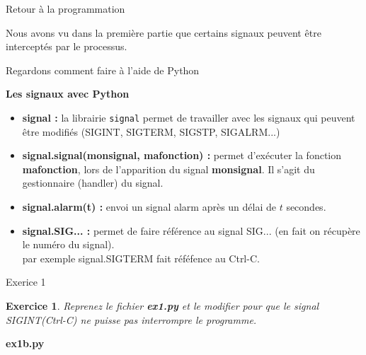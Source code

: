 \documentclass[9pt]{beamer}
\newenvironment{code}[1]{%
    \begin{bclogo}[couleur=backcolour, couleurTexte=black ,couleurBord=bleulapis ,couleurBarre=black, ombre=false,epBord=0.9,logo=\#,arrondi=0.1]{{\bfseries #1}}%
    }%
    {%
    \end{bclogo}
}%
\newtheorem{exercise}{Exercice}
\begin{document}
\begin{frame}{Retour à la
    programmation}

Nous avons vu dans la première partie que certains signaux peuvent être interceptés par le processus. 

Regardons comment faire à l'aide de Python
\begin{bclogo}[couleur=couleurdef, couleurTexte=black ,couleurBord=black ,couleurBarre=blue, ombre=false,epBord=0.9,logo=\bcbook,arrondi=0.1]{{\bfseries Les signaux avec Python}}
\begin{itemize}
    \item[\textbullet] {\bfseries signal :} la librairie  \texttt{signal} permet de travailler avec les signaux qui peuvent être modifiés (SIGINT, SIGTERM, SIGSTP, SIGALRM...)
    \item[\textbullet] {\bfseries signal.signal(monsignal, mafonction) :} permet d'exécuter la fonction \textbf{mafonction}, lors de l'apparition du signal \textbf{monsignal}. Il s'agit du gestionnaire (handler) du signal.
    \item[\textbullet] {\bfseries signal.alarm(t) :} envoi un signal alarm après un délai de $t$ secondes.
    \item[\textbullet] {\bfseries signal.SIG... :} permet de faire référence au signal SIG...  (en fait on récupère le numéro du signal).\\
    par exemple signal.SIGTERM fait réféfence au Ctrl-C.
\end{itemize}
\end{bclogo}
\end{frame}


 
\begin{frame}{Exerice 1}
\begin{exercise}
    Reprenez le fichier \textbf{ex1.py} et le modifier pour que le signal SIGINT(Ctrl-C) ne puisse pas interrompre le programme.
\end{exercise}
\pause
\begin{code}{ex1b.py}
   \parbox{10cm}{  \solex}
\end{code}
\end{frame}
\end{document}
